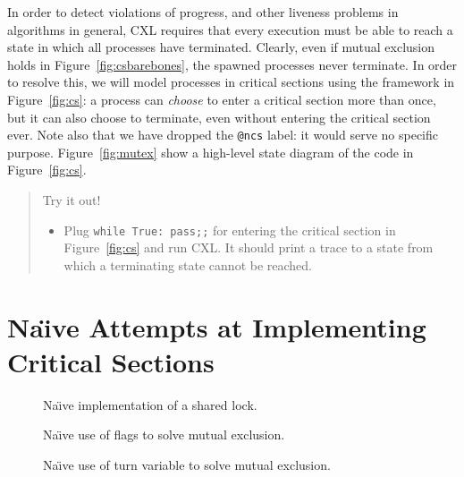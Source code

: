 \documentclass{report}
\newenvironment{code}{
\tcolorbox
}{
\endtcolorbox
}
\begin{document}
In order to detect violations of progress, and other liveness problems in
algorithms in general, CXL requires that every execution must be
able to reach a state in which all processes have terminated.
Clearly, even if mutual exclusion holds in Figure~\ref{fig:csbarebones},
the spawned processes never terminate.  In order to resolve this, we
will model processes in critical sections using the framework in
Figure~\ref{fig:cs}: a process can \emph{choose} to enter a
critical section more than once, but it can also choose to terminate, even
without entering the critical section ever.
Note also that we have dropped the \texttt{@ncs} label: it would serve no
specific purpose.
Figure~\ref{fig:mutex} show a high-level state diagram of the code in
Figure~\ref{fig:cs}.

\begin{quote}
Try it out!
\begin{itemize}
\item Plug \texttt{while True: pass;;} for entering the critical section
in Figure~\ref{fig:cs} and run CXL.  It should print a trace
to a state from which a terminating state cannot be reached.
\end{itemize}
\end{quote}


\chapter{Na\"{\i}ve Attempts at Implementing Critical Sections}

\begin{figure}
\begin{code}
\end{code}
\caption{Na\"{\i}ve implementation of a shared lock.}
\label{fig:uplock}
\end{figure}

\begin{figure}
\begin{code}
\end{code}
\caption{Na\"{\i}ve use of flags to solve mutual exclusion.}
\label{fig:upflags}
\end{figure}

\begin{figure}
\begin{code}
\end{code}
\caption{Na\"{\i}ve use of turn variable to solve mutual exclusion.}
\label{fig:upturn}
\end{figure}
\end{document}
